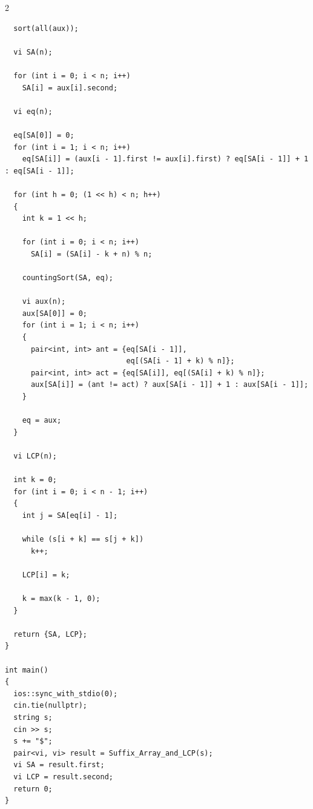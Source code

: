 \documentclass[twoside]{article}
\begin{document}
\begin{multicols*}{2}
\begin{verbatim}
  sort(all(aux));

  vi SA(n);

  for (int i = 0; i < n; i++)
    SA[i] = aux[i].second;

  vi eq(n);

  eq[SA[0]] = 0;
  for (int i = 1; i < n; i++)
    eq[SA[i]] = (aux[i - 1].first != aux[i].first) ? eq[SA[i - 1]] + 1 : eq[SA[i - 1]];

  for (int h = 0; (1 << h) < n; h++)
  {
    int k = 1 << h;

    for (int i = 0; i < n; i++)
      SA[i] = (SA[i] - k + n) % n;

    countingSort(SA, eq);

    vi aux(n);
    aux[SA[0]] = 0;
    for (int i = 1; i < n; i++)
    {
      pair<int, int> ant = {eq[SA[i - 1]],
                            eq[(SA[i - 1] + k) % n]};
      pair<int, int> act = {eq[SA[i]], eq[(SA[i] + k) % n]};
      aux[SA[i]] = (ant != act) ? aux[SA[i - 1]] + 1 : aux[SA[i - 1]];
    }

    eq = aux;
  }

  vi LCP(n);

  int k = 0;
  for (int i = 0; i < n - 1; i++)
  {
    int j = SA[eq[i] - 1];

    while (s[i + k] == s[j + k])
      k++;

    LCP[i] = k;

    k = max(k - 1, 0);
  }

  return {SA, LCP};
}

int main()
{
  ios::sync_with_stdio(0);
  cin.tie(nullptr);
  string s;
  cin >> s;
  s += "$";
  pair<vi, vi> result = Suffix_Array_and_LCP(s);
  vi SA = result.first;
  vi LCP = result.second;
  return 0;
}
\end{verbatim}

	{
}
\end{multicols*}
\end{document}
